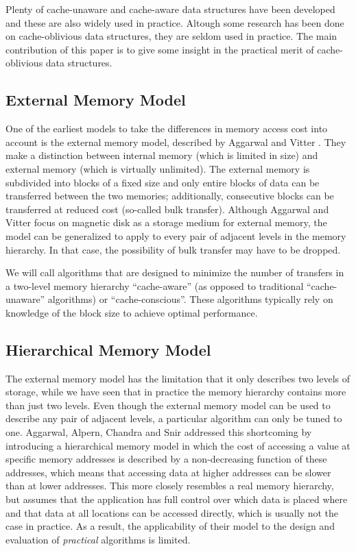 \documentclass{acm_proc_article-sp}
\begin{document}
Plenty of cache-unaware and cache-aware data structures have been developed and these are also widely used in practice. Altough some research has been done on cache-oblivious data structures, they are seldom used in practice. The main contribution of this paper is to give some insight in the practical merit of cache-oblivious data structures.

\subsection{External Memory Model}
One of the earliest models to take the differences in memory access cost into account is the external memory model, described by Aggarwal and Vitter \cite{aggarwal1988ioc}. They make a distinction between internal memory (which is limited in size) and external memory (which is virtually unlimited). The external memory is subdivided into blocks of a fixed size and only entire blocks of data can be transferred between the two memories; additionally, consecutive blocks can be transferred at reduced cost (so-called bulk transfer). Although Aggarwal and Vitter focus on magnetic disk as a storage medium for external memory, the model can be generalized to apply to every pair of adjacent levels in the memory hierarchy. In that case, the possibility of bulk transfer may have to be dropped.

We will call algorithms that are designed to minimize the number of transfers in a two-level memory hierarchy ``cache-aware'' (as opposed to traditional ``cache-unaware'' algorithms) or ``cache-conscious''. These algorithms typically rely on knowledge of the block size to achieve optimal performance.

\subsection{Hierarchical Memory Model}
The external memory model has the limitation that it only describes two levels of storage, while we have seen that in practice the memory hierarchy contains more than just two levels. Even though the external memory model can be used to describe any pair of adjacent levels, a particular algorithm can only be tuned to one. Aggarwal, Alpern, Chandra and Snir \cite{aggarwal1987mhm} addressed this shortcoming by introducing a hierarchical memory model in which the cost of accessing a value at specific memory addresses is described by a non-decreasing function of these addresses, which means that accessing data at higher addresses can be slower than at lower addresses. This more closely resembles a real memory hierarchy, but assumes that the application has full control over which data is placed where and that data at all locations can be accessed directly, which is usually not the case in practice. As a result, the applicability of their model to the design and evaluation of \emph{practical} algorithms is limited.
\end{document}
